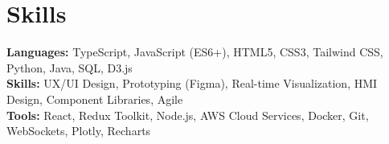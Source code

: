 \documentclass[11pt]{article}
\begin{document}
\vspace{-18.5pt}
\section*{Skills}
\textbf{Languages:} TypeScript, JavaScript (ES6+), HTML5, CSS3, Tailwind CSS, Python, Java, SQL, D3.js\\
\textbf{Skills:} UX/UI Design, Prototyping (Figma), Real-time Visualization, HMI Design, Component Libraries, Agile\\
\textbf{Tools:} React, Redux Toolkit, Node.js, AWS Cloud Services, Docker, Git, WebSockets, Plotly, Recharts\\

\vspace{-6.5pt}
\end{document}
